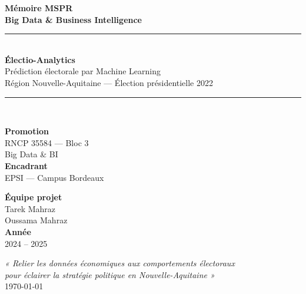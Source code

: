 \documentclass[12pt,a4paper,oneside]{report}
\begin{document}

\begin{titlepage}
  \centering
  \vspace*{1cm}
  {\Huge\bfseries\color{epsiblue} Mémoire MSPR\\[0.3cm]
   Big Data \& Business Intelligence}\\[0.5cm]
  \rule{\linewidth}{2pt}\\[0.4cm]
  {\LARGE\bfseries Électio-Analytics}\\[0.2cm]
  {\large Prédiction électorale par Machine Learning\\
   Région Nouvelle-Aquitaine — Élection présidentielle 2022}\\[0.2cm]
  \rule{\linewidth}{2pt}\\[1.5cm]

  \begin{minipage}{0.48\textwidth}
    \begin{flushleft}
      {\large\bfseries Promotion}\\
      RNCP 35584 — Bloc 3\\
      Big Data \& BI\\[0.4cm]
      {\large\bfseries Encadrant}\\
      EPSI — Campus Bordeaux
    \end{flushleft}
  \end{minipage}
  \hfill
  \begin{minipage}{0.48\textwidth}
    \begin{flushright}
      {\large\bfseries Équipe projet}\\
      Tarek Mahraz\\
      Oussama Mahraz\\[0.4cm]
      {\large\bfseries Année}\\
      2024 -- 2025
    \end{flushright}
  \end{minipage}

  \vfill
  {\large\color{darkgray}
    \textit{« Relier les données économiques aux comportements électoraux\\
    pour éclairer la stratégie politique en Nouvelle-Aquitaine »}
  }\\[1cm]
  \today
\end{titlepage}



\tableofcontents
\clearpage
\listoffigures
\clearpage
\listoftables
\clearpage
\printglossary[type=\acronymtype,title=Liste des acronymes]
\clearpage











\appendix




\end{document}
